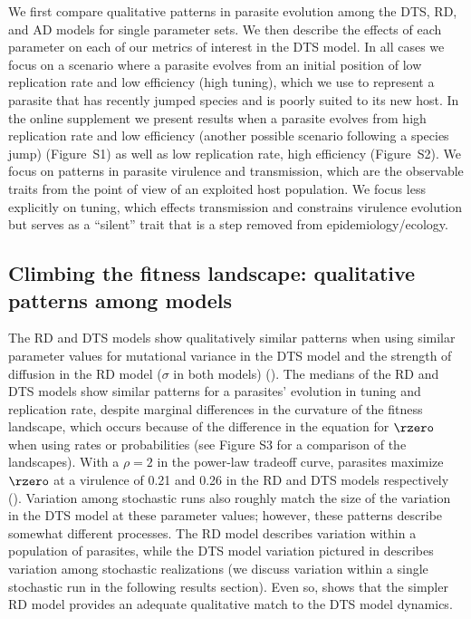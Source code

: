 We first compare qualitative patterns in parasite evolution among the DTS, RD, and AD models for single parameter sets. We then describe the effects of each parameter on each of our metrics of interest in the DTS model. In all cases we focus on a scenario where a parasite evolves from an initial position of low replication rate and low efficiency (high tuning), which we use to represent a parasite that has recently jumped species and is poorly suited to its new host. In the online supplement we present results when a parasite evolves from high replication rate and low efficiency (another possible scenario following a species jump) (Figure~S1) as well as low replication rate, high efficiency (Figure~S2). We focus on patterns in parasite virulence and transmission, which are the observable traits from the point of view of an exploited host population. We focus less explicitly on tuning, which effects transmission and constrains virulence evolution but serves as a ``silent'' trait that is a step removed from epidemiology/ecology. 

\subsection*{Climbing the fitness landscape: qualitative patterns among models}

The RD and DTS models show qualitatively similar patterns when using similar parameter values for mutational variance in the DTS model and the strength of diffusion in the RD model ($\sigma$ in both models) (). The medians of the RD and DTS models show similar patterns for a parasites' evolution in tuning and replication rate, despite marginal differences in the curvature of the fitness landscape, which occurs because of the difference in the equation for $\rzero$ when using rates or probabilities (see Figure S3 for a comparison of the landscapes). With a $\rho = 2$ in the power-law tradeoff curve, parasites maximize $\rzero$ at a virulence of 0.21 and 0.26 in the RD and DTS models respectively (). Variation among stochastic runs also roughly match the size of the variation in the DTS model at these parameter values; however, these patterns describe somewhat different processes. The RD model describes variation within a population of parasites, while the DTS model variation pictured in  describes variation among stochastic realizations (we discuss variation within a single stochastic run in the following results section). Even so,  shows that the simpler RD model provides an adequate qualitative match to the DTS model dynamics.

